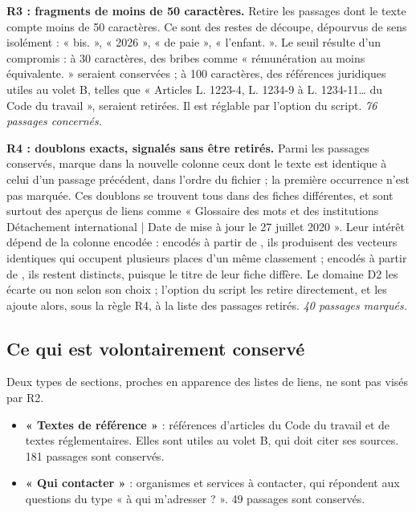 \textbf{R3 : fragments de moins de 50 caractères.} Retire les passages dont le texte compte moins de
50 caractères. Ce sont des restes de découpe, dépourvus de sens isolément : « bis. », « 2026 »,
« de paie », « l'enfant. ». Le seuil résulte d'un compromis : à 30 caractères, des bribes comme
« rémunération au moins équivalente. » seraient conservées ; à 100 caractères, des références
juridiques utiles au volet B, telles que « Articles L. 1223-4, L. 1234-9 à L. 1234-11\dots{} du Code du
travail », seraient retirées. Il est réglable par l'option  du script.
\emph{76 passages concernés.}

\textbf{R4 : doublons exacts, signalés sans être retirés.} Parmi les passages conservés, marque dans la
nouvelle colonne  ceux dont le texte est identique à celui d'un passage précédent,
dans l'ordre du fichier ; la première occurrence n'est pas marquée. Ces doublons se trouvent tous dans
des fiches différentes, et sont surtout des aperçus de liens comme « Glossaire des mots et des
institutions Détachement international | Date de mise à jour le 27 juillet 2020 ». Leur intérêt dépend
de la colonne encodée : encodés à partir de , ils produisent des vecteurs identiques qui
occupent plusieurs places d'un même classement ; encodés à partir de , ils restent
distincts, puisque le titre de leur fiche diffère. Le domaine D2 les écarte ou non selon son choix ;
l'option  du script les retire directement, et les ajoute alors, sous la règle R4,
à la liste des passages retirés.
\emph{40 passages marqués.}

\subsection{Ce qui est volontairement conservé}

Deux types de sections, proches en apparence des listes de liens, ne sont pas visés par R2.

\begin{itemize}
\item \textbf{« Textes de référence »} : références d'articles du Code du travail et de textes
réglementaires. Elles sont utiles au volet B, qui doit citer ses sources. 181 passages sont conservés.
\item \textbf{« Qui contacter »} : organismes et services à contacter, qui répondent aux questions du
type « à qui m'adresser ? ». 49 passages sont conservés.
\end{itemize}

